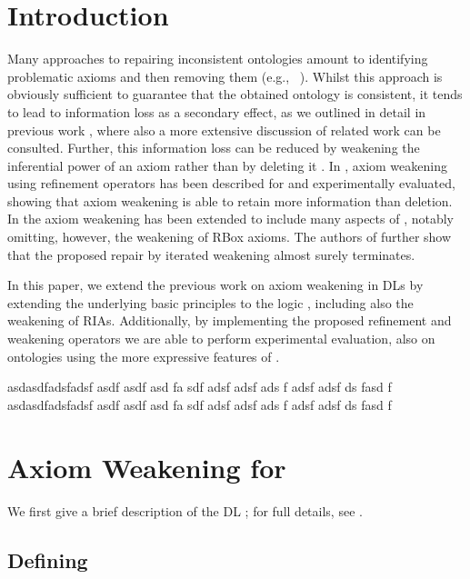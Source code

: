\documentclass[
]{ceurart}
\begin{document}
\section{Introduction}

Many approaches to repairing inconsistent ontologies amount to identifying problematic axioms and then removing them (e.g., ~\cite{ScCo03,kalyanpur2005debugging,kalyanpur2006repairing,BaPS07}). Whilst this approach is obviously sufficient to guarantee that the obtained ontology is consistent, it tends to lead to information loss as a secondary effect, as we outlined in detail in previous work \cite{troquard2018repairing,confalonieri2020towards}, where also a more extensive discussion of related work can be consulted.   Further, this information loss can be reduced by weakening the inferential power of an axiom rather than by deleting it \cite{du2014practical,AMAI-2018,DBLP:conf/kr/BaaderKNP18,troquard2018repairing,confalonieri2020towards}. 
%
In \cite{troquard2018repairing}, axiom weakening using refinement operators has been described for \ALC and experimentally evaluated, showing that axiom weakening is able to retain more information than deletion. In \cite{confalonieri2020towards} the axiom weakening has been extended to include many aspects of \SROIQ, notably omitting, however, the weakening of RBox axioms. The authors of \cite{confalonieri2020towards} further show that the proposed repair by iterated weakening almost surely terminates. 

In this  paper, we extend the previous work on axiom weakening in DLs by extending the underlying basic principles to the logic \SROIQ, including also the weakening of RIAs. Additionally, by implementing the proposed refinement and weakening operators we are able to perform experimental evaluation, also on ontologies using the more expressive features of \SROIQ. 

asdasdfadsfadsf asdf asdf asd fa sdf adsf adsf ads f adsf adsf ds fasd f asdasdfadsfadsf asdf asdf asd fa sdf adsf adsf ads f adsf adsf ds fasd f 

\section{Axiom Weakening for \SROIQ}

We first give a brief description of the DL \SROIQ; for full details, see \cite{baader_horrocks_lutz_sattler_2017,HorrocksKutzSattlerKR2006}. 

\subsection{Defining \SROIQ}
\end{document}
